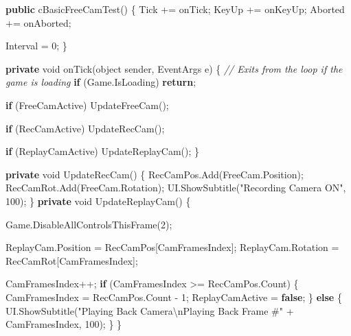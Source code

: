 \documentclass[
  openany]{book}
\newenvironment{Shaded}{\begin{snugshade}}{\end{snugshade}}
\newcommand{\CommentTok}[1]{\textcolor[rgb]{0.56,0.35,0.01}{\textit{#1}}}
\newcommand{\DataTypeTok}[1]{\textcolor[rgb]{0.13,0.29,0.53}{#1}}
\newcommand{\DecValTok}[1]{\textcolor[rgb]{0.00,0.00,0.81}{#1}}
\newcommand{\FunctionTok}[1]{\textcolor[rgb]{0.00,0.00,0.00}{#1}}
\newcommand{\KeywordTok}[1]{\textcolor[rgb]{0.13,0.29,0.53}{\textbf{#1}}}
\newcommand{\NormalTok}[1]{#1}
\newcommand{\SpecialCharTok}[1]{\textcolor[rgb]{0.00,0.00,0.00}{#1}}
\newcommand{\StringTok}[1]{\textcolor[rgb]{0.31,0.60,0.02}{#1}}
\begin{document}
\begin{Shaded}
\begin{Highlighting}[]
        \KeywordTok{public} \FunctionTok{cBasicFreeCamTest}\NormalTok{()}
\NormalTok{        \{}
\NormalTok{            Tick += onTick;}
\NormalTok{            KeyUp += onKeyUp;}
\NormalTok{            Aborted += onAborted;}

\NormalTok{            Interval = }\DecValTok{0}\NormalTok{;}
\NormalTok{        \}}

        \KeywordTok{private} \DataTypeTok{void} \FunctionTok{onTick}\NormalTok{(}\DataTypeTok{object}\NormalTok{ sender, EventArgs e)}
\NormalTok{        \{}
            \CommentTok{// Exits from the loop if the game is loading}
            \KeywordTok{if}\NormalTok{ (Game.}\FunctionTok{IsLoading}\NormalTok{) }\KeywordTok{return}\NormalTok{;}

            \KeywordTok{if}\NormalTok{ (FreeCamActive) }\FunctionTok{UpdateFreeCam}\NormalTok{();}

            \KeywordTok{if}\NormalTok{ (RecCamActive) }\FunctionTok{UpdateRecCam}\NormalTok{();}

            \KeywordTok{if}\NormalTok{ (ReplayCamActive) }\FunctionTok{UpdateReplayCam}\NormalTok{();}
\NormalTok{        \}}

        \KeywordTok{private} \DataTypeTok{void} \FunctionTok{UpdateRecCam}\NormalTok{()}
\NormalTok{        \{}
\NormalTok{            RecCamPos.}\FunctionTok{Add}\NormalTok{(FreeCam.}\FunctionTok{Position}\NormalTok{);}
\NormalTok{            RecCamRot.}\FunctionTok{Add}\NormalTok{(FreeCam.}\FunctionTok{Rotation}\NormalTok{);}
\NormalTok{            UI.}\FunctionTok{ShowSubtitle}\NormalTok{(}\StringTok{"Recording Camera ON"}\NormalTok{, }\DecValTok{100}\NormalTok{);}
\NormalTok{        \}}
        \KeywordTok{private} \DataTypeTok{void} \FunctionTok{UpdateReplayCam}\NormalTok{()}
\NormalTok{        \{}

\NormalTok{            Game.}\FunctionTok{DisableAllControlsThisFrame}\NormalTok{(}\DecValTok{2}\NormalTok{);}

\NormalTok{            ReplayCam.}\FunctionTok{Position}\NormalTok{ = RecCamPos[CamFramesIndex];}
\NormalTok{            ReplayCam.}\FunctionTok{Rotation}\NormalTok{ = RecCamRot[CamFramesIndex];}

\NormalTok{            CamFramesIndex++;}
            \KeywordTok{if}\NormalTok{ (CamFramesIndex >= RecCamPos.}\FunctionTok{Count}\NormalTok{)}
\NormalTok{            \{}
\NormalTok{                CamFramesIndex = RecCamPos.}\FunctionTok{Count}\NormalTok{ - }\DecValTok{1}\NormalTok{;}
\NormalTok{                ReplayCamActive = }\KeywordTok{false}\NormalTok{;}
\NormalTok{            \}}
            \KeywordTok{else}
\NormalTok{            \{}
\NormalTok{                UI.}\FunctionTok{ShowSubtitle}\NormalTok{(}\StringTok{"Playing Back Camera}\SpecialCharTok{\textbackslash{}n}\StringTok{Playing Back Frame #"}\NormalTok{ + CamFramesIndex, }\DecValTok{100}\NormalTok{);}
\NormalTok{            \}}
\NormalTok{        \}}


\end{Highlighting}
\end{Shaded}
\end{document}

